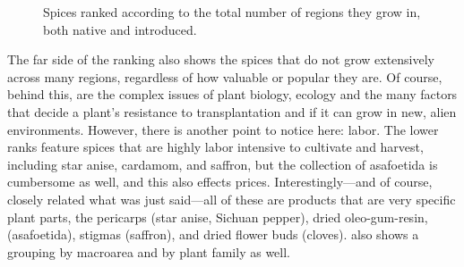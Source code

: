 \begin{figure}[!t]



	\caption{Spices ranked according to the total number of regions they grow in, both native and introduced.}
	\label{fig:total_regions}
\end{figure}



\noindent The far side of the ranking also shows the spices that do not grow extensively across many regions, regardless of how valuable or popular they are. Of course, behind this, are the complex issues of plant biology, ecology and the many factors that decide a plant's resistance to transplantation and if it can grow in new, alien environments. However, there is another point to notice here: labor. The lower ranks feature spices that are highly labor intensive to cultivate and harvest, including star anise, cardamom, and saffron, but the collection of asafoetida is cumbersome as well, and this also effects prices. Interestingly---and of course, closely related what was just said---all of these are products that are very specific plant parts, the pericarps (star anise, Sichuan pepper), dried oleo-gum-resin, (asafoetida), stigmas (saffron), and dried flower buds (cloves).  also shows a grouping by macroarea and by plant family as well.



